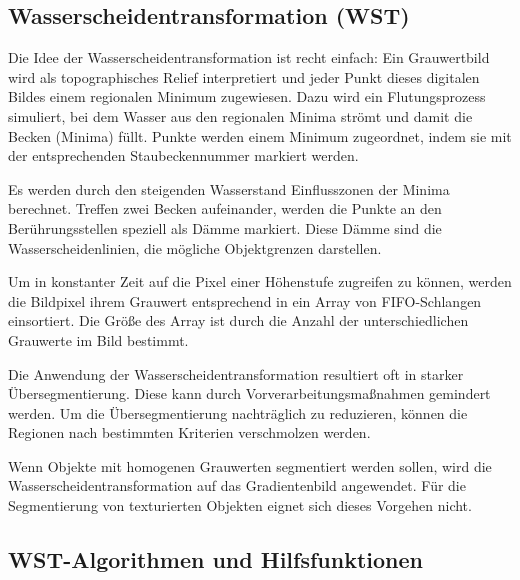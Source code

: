 \subsection{Wasserscheidentransformation (WST)}

Die Idee der Wasserscheidentransformation ist recht einfach: Ein Grauwertbild
wird als topographisches Relief interpretiert und jeder Punkt dieses
digitalen Bildes einem regionalen Minimum zugewiesen.
Dazu wird ein Flutungsprozess simuliert, bei dem Wasser aus den
regionalen Minima str\"omt und damit die Becken (Minima) füllt.
Punkte werden einem Minimum zugeordnet, indem sie mit der entsprechenden 
Staubeckennummer markiert werden.

Es werden durch den steigenden Wasserstand Einflusszonen der Minima
berechnet. Treffen zwei Becken aufeinander, werden die Punkte an den 
Ber\"uhrungsstellen speziell als D\"amme markiert. Diese D\"amme sind 
die Wasserscheidenlinien, die m\"ogliche Objektgrenzen darstellen.

Um in konstanter Zeit auf die Pixel einer H\"ohenstufe zugreifen zu 
k\"onnen, werden die Bildpixel ihrem Grauwert entsprechend in ein Array 
von FIFO-Schlangen einsortiert. Die Gr\"o\ss e des Array ist durch die 
Anzahl der unterschiedlichen Grauwerte im Bild bestimmt.

Die Anwendung der Wasserscheidentransformation resultiert oft in starker
\"Ubersegmentierung. Diese kann durch Vorverarbeitungsmaßnahmen gemindert 
werden. Um die \"Ubersegmentierung nachtr\"aglich zu reduzieren, k\"onnen 
die Regionen nach bestimmten Kriterien verschmolzen werden.

Wenn Objekte mit homogenen Grauwerten segmentiert werden sollen, wird die
Wasserscheidentransformation auf das Gradientenbild angewendet. F\"ur die
Segmentierung von texturierten Objekten eignet sich dieses Vorgehen nicht.

\subsection{WST-Algorithmen und Hilfsfunktionen}



